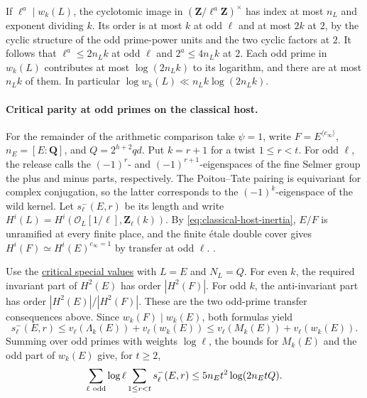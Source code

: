 If \(\ell^a\mid w_k(L)\), the cyclotomic image in
\((\mathbf Z/\ell^a\mathbf Z)^\times\) has index at most \(n_L\)
and exponent dividing \(k\). Its order is at most \(k\) at odd
\(\ell\) and at most \(2k\) at \(2\), by the cyclic structure of
the odd prime-power units and the two cyclic factors at \(2\).
It follows that \(\ell^a\le2n_Lk\) at odd \(\ell\) and
\(2^a\le4n_Lk\) at \(2\). Each odd prime in \(w_k(L)\) contributes
at most \(\log(2n_Lk)\) to its logarithm, and there are at most
\(n_Lk\) of them. In particular
\(\log w_k(L)\ll n_Lk\log(2n_Lk)\).

\paragraph{Critical parity at odd primes on the classical host.}
%
For the remainder of the arithmetic comparison take \(\psi=1\), write
\(F=E^{\langle c_\infty\rangle}\), \(n_E=[E:\mathbf Q]\), and
\(Q=2^{h+2}qd\). Put \(k=r+1\) for a twist \(1\le r<t\).
For odd \(\ell\), the release calls the \((-1)^r\)- and
\((-1)^{r+1}\)-eigenspaces of the fine Selmer group the plus and minus
parts, respectively. The Poitou--Tate pairing is equivariant for
complex conjugation, so the latter corresponds to the
\((-1)^k\)-eigenspace of the wild kernel. Let \(s_\ell^-(E,r)\) be its
length and write \(H^i(L)=H^i(\mathcal O_L[1/\ell],\mathbf Z_\ell(k))\).
By \eqref{eq:classical-host-inertia}, \(E/F\) is unramified at every
finite place, and the finite \'etale double cover gives
\(H^i(F)\simeq H^i(E)^{c_\infty=1}\) by transfer at odd \(\ell\).
.

Use the
\hyperlink{proof.shared-critical-selmer-values}{critical special values}
with \(L=E\) and \(N_L=Q\). For even \(k\), the required invariant
part of \(H^2(E)\) has order \(|H^2(F)|\). For odd \(k\),
the anti-invariant part has order \(|H^2(E)|/|H^2(F)|\).
These are the two odd-prime transfer consequences above.
Since \(w_k(F)\mid w_k(E)\), both formulas yield
\[
 s_\ell^-(E,r)\le v_\ell(\Lambda_k(E))+v_\ell(w_k(E))
               \le v_\ell(M_k(E))+v_\ell(w_k(E)).
\]
Summing over odd primes with weights \(\log\ell\), the bounds for
\(M_k(E)\) and the odd part of \(w_k(E)\) give, for \(t\ge2\),
\begin{equation}
\label{eq:family-critical-selmer}
 \sum_{\ell\ {\rm odd}}\log\ell \sum_{1\le r<t}s_\ell^-(E,r)
       \le 5n_Et^2\log(2n_EtQ).
\end{equation}

